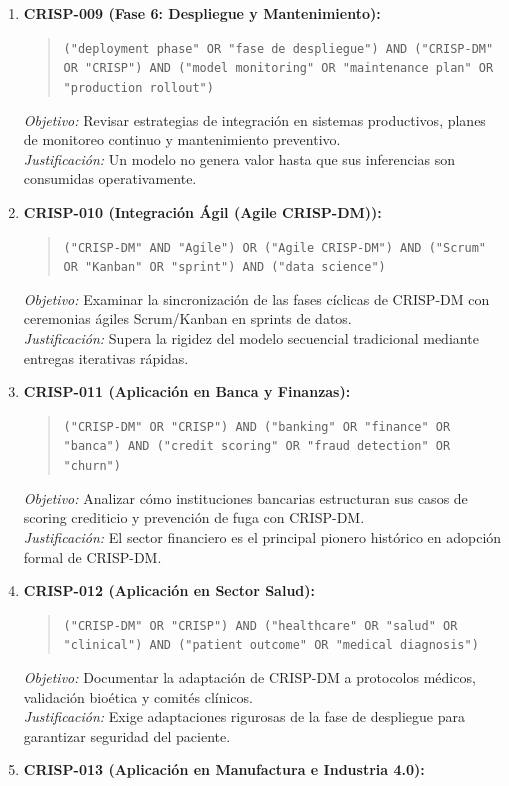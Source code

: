 \begin{enumerate}
  \item \textbf{CRISP-009 (Fase 6: Despliegue y Mantenimiento):}
  \begin{quote}
  \texttt{("deployment phase" OR "fase de despliegue") AND ("CRISP-DM" OR "CRISP") AND ("model monitoring" OR "maintenance plan" OR "production rollout")}
  \end{quote}
  \textit{Objetivo:} Revisar estrategias de integración en sistemas productivos, planes de monitoreo continuo y mantenimiento preventivo.\\
  \textit{Justificación:} Un modelo no genera valor hasta que sus inferencias son consumidas operativamente.
  \item \textbf{CRISP-010 (Integración Ágil (Agile CRISP-DM)):}
  \begin{quote}
  \texttt{("CRISP-DM" AND "Agile") OR ("Agile CRISP-DM") AND ("Scrum" OR "Kanban" OR "sprint") AND ("data science")}
  \end{quote}
  \textit{Objetivo:} Examinar la sincronización de las fases cíclicas de CRISP-DM con ceremonias ágiles Scrum/Kanban en sprints de datos.\\
  \textit{Justificación:} Supera la rigidez del modelo secuencial tradicional mediante entregas iterativas rápidas.
  \item \textbf{CRISP-011 (Aplicación en Banca y Finanzas):}
  \begin{quote}
  \texttt{("CRISP-DM" OR "CRISP") AND ("banking" OR "finance" OR "banca") AND ("credit scoring" OR "fraud detection" OR "churn")}
  \end{quote}
  \textit{Objetivo:} Analizar cómo instituciones bancarias estructuran sus casos de scoring crediticio y prevención de fuga con CRISP-DM.\\
  \textit{Justificación:} El sector financiero es el principal pionero histórico en adopción formal de CRISP-DM.
  \item \textbf{CRISP-012 (Aplicación en Sector Salud):}
  \begin{quote}
  \texttt{("CRISP-DM" OR "CRISP") AND ("healthcare" OR "salud" OR "clinical") AND ("patient outcome" OR "medical diagnosis")}
  \end{quote}
  \textit{Objetivo:} Documentar la adaptación de CRISP-DM a protocolos médicos, validación bioética y comités clínicos.\\
  \textit{Justificación:} Exige adaptaciones rigurosas de la fase de despliegue para garantizar seguridad del paciente.
  \item \textbf{CRISP-013 (Aplicación en Manufactura e Industria 4.0):}

\end{enumerate}
